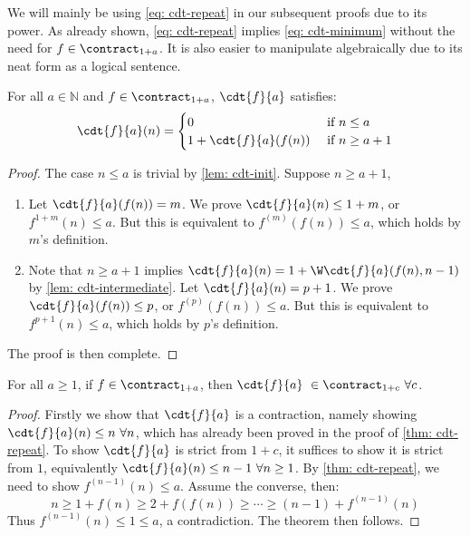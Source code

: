 \begin{rem}
We will mainly be using \eqref{eq: cdt-repeat} in our subsequent proofs due to its power. As already shown, \eqref{eq: cdt-repeat} implies \eqref{eq: cdt-minimum} without the need for $f\in \contract_{1+a}$. It is also easier to manipulate algebraically due to its neat form as a logical sentence.
\end{rem}

\begin{thm} \label{thm: cdt-recursion}
For all $a\in \mathbb{N}$ and $f\in \contract_{1+a}$, $\cdt{f}{a}$ satisfies:
$$ \cdt{f}{a}(n) = \begin{cases}
0 & \text{ if } n \le a \\ 1 + \cdt{f}{a}(f(n)) & \text{ if } n \ge a + 1
\end{cases} $$
\end{thm}
\begin{proof}
The case $n\le a$ is trivial by \cref{lem: cdt-init}. Suppose $n\ge a+1$,
\begin{enumerate}[leftmargin=*]
	\item Let $\cdt{f}{a}(f(n)) = m$. We prove $\cdt{f}{a}(n)\le 1+m$, or $f^{1+m}(n) \le a$. But this is equivalent to $f^{(m)}(f(n)) \le a$, which holds by $m$'s definition.
	\item Note that $n\ge a+1$ implies $\cdt{f}{a}(n) = 1 + \W\cdt{f}{a}(f(n), n - 1)$ by \cref{lem: cdt-intermediate}. Let $\cdt{f}{a}(n) = p + 1$. We prove $\cdt{f}{a}(f(n))\le p$, or $f^{(p)}(f(n))\le a$. But this is equivalent to $f^{p+1}(n)\le a$, which holds by $p$'s definition.
\end{enumerate}
The proof is then complete.
\end{proof}

\begin{thm} \label{thm: cdt-contr-0}
For all $a\ge 1$, if $f\in \contract_{1+a}$, then $\cdt{f}{a}\ \in \contract_{1+c} \ \forall c$.
\end{thm}
\begin{proof}
Firstly we show that $\cdt{f}{a}$ is a contraction, namely showing $\cdt{f}{a}(n)\le n \ \forall n$, which has already been proved in the proof of \cref{thm: cdt-repeat}. To show $\cdt{f}{a}$ is strict from $1+c$, it suffices to show it is strict from $1$, equivalently $\cdt{f}{a}(n) \le n - 1 \ \forall n\ge 1$. By \cref{thm: cdt-repeat}, we need to show $f^{(n-1)}(n)\le a$. Assume the converse, then:
$$ n \ge 1 + f(n)\ge 2 + f(f(n)) \ge \cdots \ge (n-1) + f^{(n-1)}(n) $$
Thus $f^{(n-1)}(n)\le 1 \le a$, a contradiction. The theorem then follows.
\end{proof}

